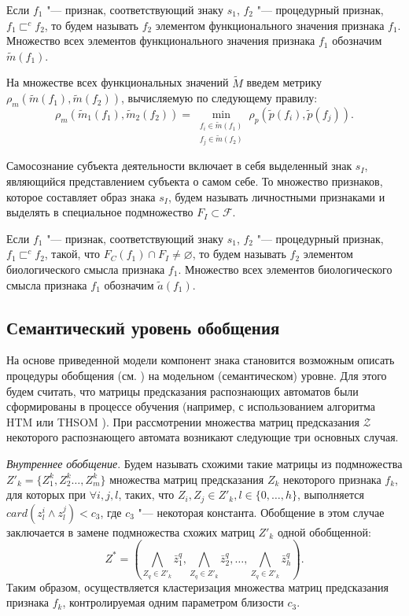 \documentclass[a4paper, 12pt]{article}
\numberwithin{equation}{section}
\begin{document}
		Если $f_1$ "--- признак, соответствующий знаку $s_1$, $f_2$ "--- процедурный признак, $f_1\sqsubset^c f_2$, то будем называть $f_2$ элементом функционального значения признака $f_1$. Множество всех элементов функционального значения признака $f_1$ обозначим $\tilde m(f_1)$.
	
	На множестве всех функциональных значений $\tilde M$ введем метрику $\rho_m(\tilde m(f_1),\tilde m(f_2))$, вычисляемую по следующему правилу:
	\begin{equation}\label{eq:m_metr}
		\rho_m(\tilde m_1(f_1),\tilde m_2(f_2 ))=\min\limits_{\substack{f_i\in\tilde m(f_1 )\\f_j\in\tilde m(f_2 )}}\rho_p(\tilde p(f_i ),\tilde p(f_j )).
	\end{equation}
		
	Самосознание субъекта деятельности включает в себя выделенный знак $s_I$, являющийся представлением субъекта о самом себе. То множество признаков, которое составляет образ знака $s_I$, будем называть личностными признаками и выделять в специальное подмножество $F_I\subset\mathcal F$.
	
	\label{def:meaning} Если $f_1$ "--- признак, соответствующий знаку $s_1$, $f_2$ "--- процедурный признак, $f_1\sqsubset^c f_2$, такой, что $F_C(f_1)\cap F_I\not = \varnothing$, то будем называть $f_2$ элементом биологического смысла признака $f_1$. Множество всех элементов биологического смысла признака $f_1$ обозначим $\tilde a(f_1)$.
	
	\subsection{Семантический уровень обобщения} На основе приведенной модели компонент знака становится возможным описать процедуры обобщения (см. \cite{PanovA2014a}) на модельном (семантическом) уровне. Для этого будем считать, что матрицы предсказания распознающих автоматов были сформированы в процессе обучения (например, с использованием алгоритма HTM \cite{Hawkins2009} или THSOM \cite{Koutn2008}). При рассмотрении множества матриц предсказания $\mathcal Z$ некоторого распознающего автомата возникают следующие три основных случая.
	
	\textit{Внутреннее обобщение}. Будем называть схожими такие матрицы из подмножества $Z'_k=\{Z_1^k,Z_2^k\dots,Z_m^k\}$ множества матриц предсказания $Z_k$ некоторого признака $f_k$, для которых при $\forall i,j,l$, таких, что $Z_i,Z_j\in Z'_k,l\in\{0,\dots,h\}$, выполняется $card(z_l^i\wedge z_l^j)<c_3$, где $c_3$ "--- некоторая константа. Обобщение в этом случае заключается в замене подмножества схожих матриц $Z'_k$ одной обобщенной:
		\begin{equation*}
			Z^*=(\bigwedge\limits_{Z_q\in Z'_k}\bar z_1^q,\bigwedge\limits_{Z_q\in Z'_k}\bar z_2^q,\dots,\bigwedge\limits_{Z_q\in Z'_k}\bar z_h^q).
		\end{equation*}
		Таким образом, осуществляется кластеризация множества матриц предсказания признака $f_k$, контролируемая одним параметром близости $c_3$.
	
\end{document}
